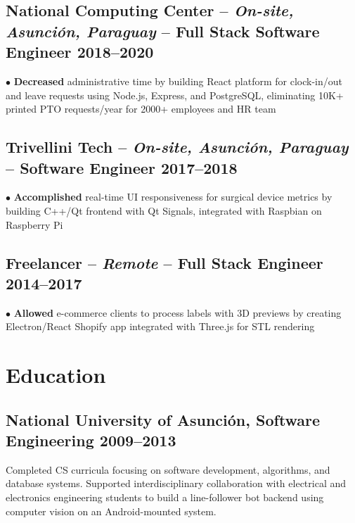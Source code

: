 \documentclass[10pt,a4paper]{article}
\newcommand{\actionverb}[1]{\textcolor{actioncolor}{\textbf{#1}}}
\newcommand{\cvsinglecompany}[5]{
  \subsection{#1 \textcolor{mediumgray}{#2} -- \textbf{\small #3} \hfill {\footnotesize\textcolor{mediumgray}{#4}}}
  {\footnotesize #5}
  \vspace{0.2em}
}
\newcommand{\cveducation}[4]{
  \subsection{#1, \textbf{\small #2} \hfill {\footnotesize\textcolor{mediumgray}{#3}}}
  {\footnotesize #4}
}
\begin{document}
\cvsinglecompany{National Computing Center}{-- \textit{On-site, Asunción, Paraguay}}{Full Stack Software Engineer}{2018--2020}{
$\bullet$ \actionverb{Decreased} administrative time by building React platform for clock-in/out and leave requests using Node.js, Express, and PostgreSQL, eliminating 10K+ printed PTO requests/year for 2000+ employees and HR team
}

\cvsinglecompany{Trivellini Tech}{-- \textit{On-site, Asunción, Paraguay}}{Software Engineer}{2017--2018}{
$\bullet$ \actionverb{Accomplished} real-time UI responsiveness for surgical device metrics by building C++/Qt frontend with Qt Signals, integrated with Raspbian on Raspberry Pi
}

\cvsinglecompany{Freelancer}{-- \textit{Remote}}{Full Stack Engineer}{2014--2017}{
$\bullet$ \actionverb{Allowed} e-commerce clients to process labels with 3D previews by creating Electron/React Shopify app integrated with Three.js for STL rendering
}




\section{Education}
\cveducation{National University of Asunción}{Software Engineering}{2009--2013}{Completed CS curricula focusing on software development, algorithms, and database systems. Supported interdisciplinary collaboration with electrical and electronics engineering students to build a line-follower bot backend using computer vision on an Android-mounted system.}
\end{document}
